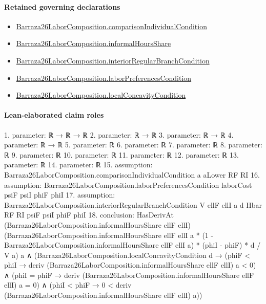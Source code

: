 \documentclass[10pt]{article}
\begin{document}
\paragraph{Retained governing declarations}
\begin{itemize}\raggedright
\item \hyperlink{paper-prerequisite-58beaf7552967aba}{Barraza26\allowbreak{}Labor\allowbreak{}Composition.\allowbreak{}comparison\allowbreak{}Individual\allowbreak{}Condition}
\item \hyperlink{paper-prerequisite-2d2c170b2398bfe9}{Barraza26\allowbreak{}Labor\allowbreak{}Composition.\allowbreak{}informal\allowbreak{}Hours\allowbreak{}Share}
\item \hyperlink{paper-prerequisite-d20c04fcbad99299}{Barraza26\allowbreak{}Labor\allowbreak{}Composition.\allowbreak{}interior\allowbreak{}Regular\allowbreak{}Branch\allowbreak{}Condition}
\item \hyperlink{paper-prerequisite-552e4781bba8ea77}{Barraza26\allowbreak{}Labor\allowbreak{}Composition.\allowbreak{}labor\allowbreak{}Preferences\allowbreak{}Condition}
\item \hyperlink{paper-prerequisite-254a7cb2686ab65e}{Barraza26\allowbreak{}Labor\allowbreak{}Composition.\allowbreak{}local\allowbreak{}Concavity\allowbreak{}Condition}
\end{itemize}
\paragraph{Lean-elaborated claim roles}\begin{ReviewVerbatim}
1. parameter: ℝ → ℝ → ℝ
2. parameter: ℝ → ℝ
3. parameter: ℝ → ℝ
4. parameter: ℝ → ℝ
5. parameter: ℝ
6. parameter: ℝ
7. parameter: ℝ
8. parameter: ℝ
9. parameter: ℝ
10. parameter: ℝ
11. parameter: ℝ
12. parameter: ℝ
13. parameter: ℝ
14. parameter: ℝ
15. assumption: Barraza26LaborComposition.comparisonIndividualCondition a aLower RF RI
16. assumption: Barraza26LaborComposition.laborPreferencesCondition laborCost psiF psiI phiF phiI
17. assumption: Barraza26LaborComposition.interiorRegularBranchCondition V ellF ellI a d Hbar RF RI psiF psiI phiF phiI
18. conclusion: HasDerivAt (Barraza26LaborComposition.informalHoursShare ellF ellI)
    (Barraza26LaborComposition.informalHoursShare ellF ellI a *
            (1 - Barraza26LaborComposition.informalHoursShare ellF ellI a) *
          (phiI - phiF) *
        d /
      V a)
    a ∧
  (Barraza26LaborComposition.localConcavityCondition d →
    (phiF < phiI → deriv (Barraza26LaborComposition.informalHoursShare ellF ellI) a < 0) ∧
      (phiI = phiF → deriv (Barraza26LaborComposition.informalHoursShare ellF ellI) a = 0) ∧
        (phiI < phiF → 0 < deriv (Barraza26LaborComposition.informalHoursShare ellF ellI) a))
\end{ReviewVerbatim}
\end{document}
